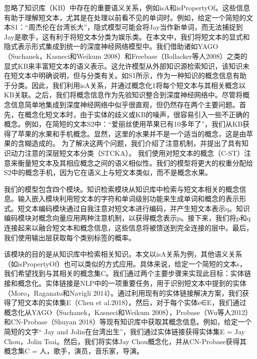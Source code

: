 忽略了知识库（KB）中存在的重要语义关系，例如isA和isPropertyOf。这些信息有助于理解短文本，尤其是在处理以前看不见的单词时。例如，给定一个简短的文本S1：“周杰伦在台湾长大”，隐式模型可能会将Jay当作新单词，而无法捕捉到Jay是歌手，这有利于将短文本分类为娱乐类。在本文中，我们将短文本的显式和隐式表示形式集成到统一的深度神经网络模型中。我们借助诸如YAGO（Suchanek，Kasneci和Weikum 2008）和Freebase（Bollacker等人2008）之类的显式KB来丰富短文本的语义表示。这允许模型从外部知识源检索知识，该知识未在短文本中明确说明，但与分类有关。如S1所示，作为一种知识的概念信息有助于分类。因此，我们利用isA关系，并通过概念化1将每个短文本与其相关概念以KB关联。之后，我们将概念信息作为先验知识整合到深度神经网络中。尽管将概念信息简单地集成到深度神经网络中似乎很直观，但仍然存在两个主要问题。首先，在概念化短文本时，由于实体的歧义或KB的噪声，很容易引入一些不正确的概念。例如，在简短的文本S2中：“爱丽丝使用苹果已有10多年了”，我们从KB获得了苹果的水果和手机概念。显然，这里的水果并不是一个适当的概念，这是由苹果的含糊造成的。
为了解决这两个问题，我们介绍了注意机制，并提出了具有知识动力注意的深层短文本分类（STCKA）。
我们使用对短文本的概念（C-ST）注意来衡量短文本及其相应概念之间的语义相似性。我们的模型将更大的权重分配给S2中的概念手机，因为它在语义上与短文本类似，而不是概念水果。

我们的模型包含四个模块。知识检索模块从知识库中检索与短文本相关的概念信息。输入嵌入模块利用短文本的字符和单词级别功能来生成单词和概念的表示形式。短文本编码模块通过自我注意对短文本进行编码，并产生短文本表示q。知识编码模块对概念向量应用两种注意机制，以获得概念表示p。接下来，我们将p和q连接起来以融合短文本和概念信息，这些信息将被馈送到完全连接的层中。最后，我们使用输出层获取每个类别标签的概率。

该模块的目的是从知识库中检索相关知识。本文以isA关系为例，其他语义关系（如isPropertyOf）也可以类似的方式应用。具体来说，给定一个简短的文本s，我们希望找到与其相关的概念集C。我们通过两个主要步骤来实现此目标：实体链接和概念化。实体链接是NLP中的一项重要任务，用于识别短文本中提到的实体（Moro，Raganato和Navigli 2014）。通过利用现有的实体链接解决方案，我们获得了短文本的实体集E（Chen et al.2018）。然后，对于每个实体e∈E，我们通过概念化从YAGO（Suchanek，Kasneci和Weikum 2008），Probase（Wu等人2012）和CN-Probase（Shuyan 2018）等现有知识库中获取其概念信息。例如，给定一个简短的文字“ Jay and Jolin在台湾出生”，我们通过实体链接获得实体集E = {Jay Chou，Jolin Tsai}。然后，我们将实体Jay Chou概念化，并从CN-Probase获得其概念集C = {人，歌手，演员，音乐家，导演}。

